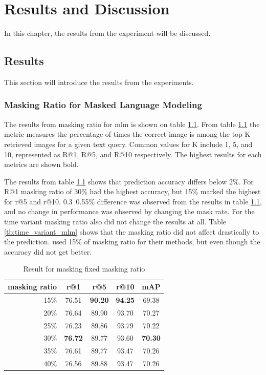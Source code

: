 

\chapter{Results and Discussion}
In this chapter, the results from the experiment will be discussed.

\section{Results}
This section will introduce the results from the experiments.

\subsection{Masking Ratio for Masked Language Modeling}
The results from masking ratio for \acrshort{mlm} is shown on table \ref{tb:fixed_mlm}. From table \ref{tb:fixed_mlm} the metric measures the percentage of times the correct image is among the top K retrieved images for a given text query. Common values for K include 1, 5, and 10, represented as R@1, R@5, and R@10 respectively. The highest results for each metrics are shown bold.

The results from table \ref{tb:fixed_mlm} shows that prediction accuracy differs below 2\%. For R@1 masking ratio of 30\% had the highest accuracy, but 15\% marked the highest for r@5 and r@10. 0.3~0.55\% difference was observed from the results in table \ref{tb:fixed_mlm}, and no change in performance was observed by changing the mask rate.
For the time variant masking ratio also did not change the results at all. Table \ref{tb:time_variant_mlm} shows that the masking ratio did not affect drastically to the prediction. \cite{Bai2023RaSaRA} used 15\% of masking ratio for their methods, but even though the accuracy did not get better.

\begin{table}[htbp]
    \centering
    \caption{Result for masking fixed masking ratio}
    \label{tb:fixed_mlm}
    
    \begin{tabular}{rcccc}
      masking ratio & r@1 & r@5 & r@10 & mAP\\ \hline
      15\% & 76.51 & \textbf{90.20} & \textbf{94.25} & 69.38 \\
      20\% & 76.64 & 89.90 & 93.70 & 70.27 \\
      25\% & 76.23 & 89.86 & 93.79 & 70.22 \\
      30\% & \textbf{76.72} & 89.77 & 93.60 & \textbf{70.30} \\
      35\% & 76.61 & 89.77 & 93.47 & 70.26 \\
      40\% & 76.56 & 89.88 & 93.47 & 70.26
    \end{tabular}
\end{table}

